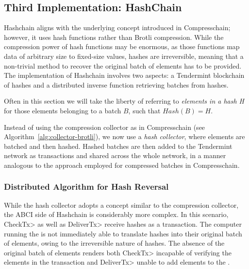 \subsection{Third Implementation: HashChain}\label{subsec:hashchain}
%
Hashchain aligns with the underlying concept introduced in Compresschain;
however, it uses hash functions rather than Brotli compression.
%
While the compression power of hash functions may be enormous, as those
functions map data of arbitrary size to fixed-size values, hashes are
irreversible, meaning that a non-trivial method to recover the original batch of elements
has to be provided.
%
The implementation of Hashchain involves two aspects: a Tendermint blockchain of
hashes and a distributed inverse function retrieving batches from hashes.
%

Often in this section we will take the liberty of referring to \textit{elements
in a hash H} for those elements belonging to a batch $B$, such that
$Hash(B) = H$.

Instead of using the compression collector as in Compresschain (see
Algorithm~\ref{alg:collector-brotli}), we now use a \emph{hash
collector}, where elements are batched and then hashed. 
%
Hashed batches are then added to the Tendermint network as transactions and
shared across the whole network, in a manner analogous to the approach employed
for compressed batches in Compresschain.

\subsubsection{Distributed Algorithm for Hash Reversal}

While the hash collector adopts a concept similar to the compression collector,
the ABCI side of Hashchain is considerably more complex.
%
In this scenario, \<CheckTx> as well as \<DeliverTx> receive hashes as a transaction.
%
The computer running the \setchain is not immediately able to translate
hashes into their original batch of elements, owing to the irreversible
nature of hashes.
%
The absence of the original batch of elements renders both \<CheckTx> incapable
of verifying the elements in the transaction and \<DeliverTx> unable to
add elements to the \setchain.
%

